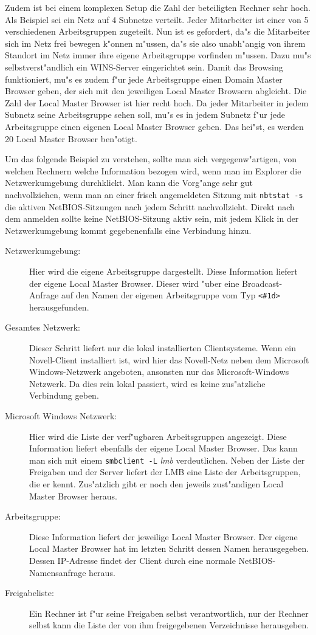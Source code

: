 \documentclass{scrartcl}\usepackage{pslatex}\typearea{12}
\newcommand{\prog}{\texttt}
\newcommand{\nbname}{\texttt}
\begin{document}
Zudem ist bei einem komplexen Setup die Zahl der beteiligten Rechner
sehr hoch. Als Beispiel sei ein Netz auf 4 Subnetze verteilt. Jeder
Mitarbeiter ist einer von 5 verschiedenen Arbeitsgruppen zugeteilt.
Nun ist es gefordert, da"s die Mitarbeiter sich im Netz frei bewegen
k"onnen m"ussen, da"s sie also unabh"angig von ihrem Standort im Netz
immer ihre eigene Arbeitsgruppe vorfinden m"ussen. Dazu mu"s
selbstverst"andlich ein WINS-Server eingerichtet sein. Damit das
Browsing funktioniert, mu"s es zudem f"ur jede Arbeitsgruppe einen
Domain Master Browser geben, der sich mit den jeweiligen Local Master
Browsern abgleicht. Die Zahl der Local Master Browser ist hier recht
hoch. Da jeder Mitarbeiter in jedem Subnetz seine Arbeitsgruppe sehen
soll, mu"s es in jedem Subnetz f"ur jede Arbeitsgruppe einen eigenen
Local Master Browser geben. Das hei"st, es werden 20 Local Master
Browser ben"otigt.

Um das folgende Beispiel zu verstehen, sollte man sich
vergegenw"artigen, von welchen Rechnern welche Information bezogen
wird, wenn man im Explorer die Netzwerkumgebung durchklickt. Man kann
die Vorg"ange sehr gut nachvollziehen, wenn man an einer frisch
angemeldeten Sitzung mit \prog{nbtstat -s} die aktiven
NetBIOS-Sitzungen nach jedem Schritt nachvollzieht. Direkt nach dem
anmelden sollte keine NetBIOS-Sitzung aktiv sein, mit jedem Klick in
der Netzwerkumgebung kommt gegebenenfalls eine Verbindung hinzu.

\begin{description}
\item[Netzwerkumgebung:] Hier wird die eigene Arbeitsgruppe
  dargestellt. Diese Information liefert der eigene Local Master
  Browser. Dieser wird "uber eine Broadcast-Anfrage auf den Namen der
  eigenen Arbeitsgruppe vom Typ \nbname{<\#1d>} herausgefunden.
\item[Gesamtes Netzwerk:] Dieser Schritt liefert nur die lokal
  installierten Clientsysteme. Wenn ein Novell-Client installiert ist,
  wird hier das Novell-Netz neben dem Microsoft Windows-Netzwerk
  angeboten, ansonsten nur das Microsoft-Windows Netzwerk. Da dies
  rein lokal passiert, wird es keine zus"atzliche Verbindung geben.
\item[Microsoft Windows Netzwerk:] Hier wird die Liste der
  verf"ugbaren Arbeitsgruppen angezeigt. Diese Information liefert
  ebenfalls der eigene Local Master Browser. Das kann man sich mit
  einem \prog{smbclient -L} \emph{ lmb} verdeutlichen. Neben der Liste der
  Freigaben und der Server liefert der LMB eine Liste der
  Arbeitsgruppen, die er kennt. Zus"atzlich gibt er noch den jeweils
  zust"andigen Local Master Browser heraus.
\item[Arbeitsgruppe:] Diese Information liefert der jeweilige Local
  Master Browser. Der eigene Local Master Browser hat im letzten
  Schritt dessen Namen herausgegeben. Dessen IP-Adresse findet der
  Client durch eine normale NetBIOS-Namensanfrage heraus.
\item[Freigabeliste:] Ein Rechner ist f"ur seine Freigaben selbst
  verantwortlich, nur der Rechner selbst kann die Liste der von ihm
  freigegebenen Verzeichnisse herausgeben.
\end{description}
\end{document}
